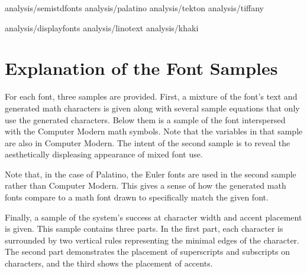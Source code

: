 \documentclass[twocolumn]{article}
\def\inputsect#1{\let\sectionname#1}
\begin{document}
\inputsect\section analysis/semistdfonts
\inputsect\subsection analysis/palatino
\inputsect\subsection analysis/tekton
\inputsect\subsection analysis/tiffany

\inputsect\section analysis/displayfonts
\inputsect\subsection analysis/linotext
\inputsect\subsection analysis/khaki

\section{Explanation of the Font Samples}

For each font, three samples are provided. First, a mixture of the font's text
and generated math characters is given along with several sample equations that
only use the generated characters. Below them is a sample of the font
interspersed with the Computer Modern math symbols. Note that the variables in
that sample are also in Computer Modern. The intent of the second sample is to
reveal the aesthetically displeasing appearance of mixed font use.

Note that, in the case of Palatino, the Euler fonts are used in the second
sample rather than Computer Modern. This gives a sense of how the generated math
fonts compare to a math font drawn to specifically match the given font.

Finally, a sample of the system's success at character width and accent
placement is given. This sample contains three parts. In the first part, each
character is surrounded by two vertical rules representing the minimal edges of
the character. The second part demonstrates the placement of superscripts and
subscripts on characters, and the third shows the placement of accents.
\end{document}
